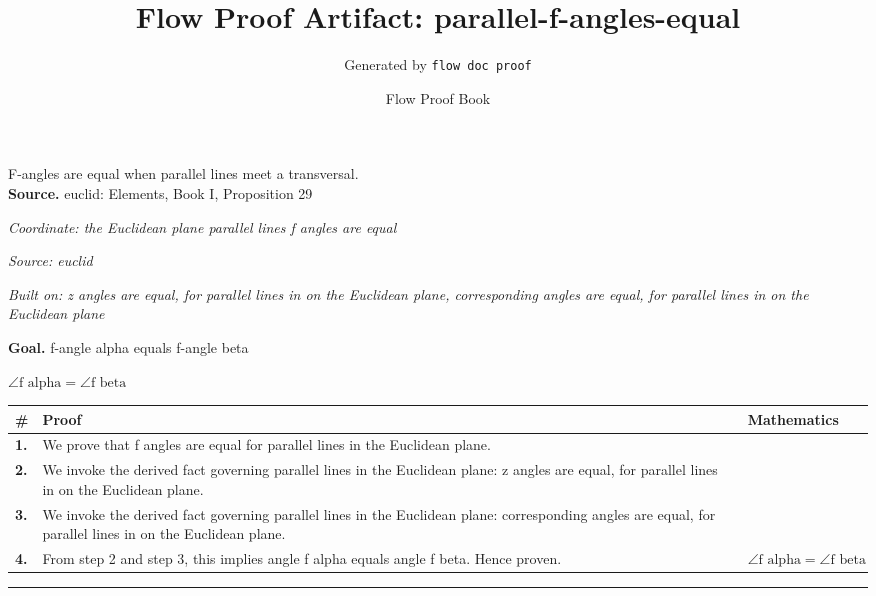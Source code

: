\documentclass[11pt]{article}
\title{Flow Proof Artifact: parallel-f-angles-equal}
\author{Generated by \texttt{flow doc proof}}
\date{Flow Proof Book}
\theoremstyle{definition}
\begin{document}
\maketitle
F-angles are equal when parallel lines meet a transversal.\\[0.5em]
\textbf{Source.} euclid: Elements, Book I, Proposition 29\\[0.5em]
\bigskip
{}\par
\smallskip\noindent\textit{Coordinate: the Euclidean plane \cdot parallel lines \cdot f angles are equal}\par
\smallskip\noindent\textit{Source: euclid}\par
\smallskip\noindent\textit{Built on: z angles are equal, for parallel lines in on the Euclidean plane, corresponding angles are equal, for parallel lines in on the Euclidean plane}\par
\medskip
\noindent\textbf{Goal.} f-angle alpha equals f-angle beta\par
\noindent$\displaystyle \angle \text{f alpha} = \angle \text{f beta}$\par
\medskip
\noindent
\begin{tabular}{@{} >{\raggedright\arraybackslash}p{} >{\raggedright\arraybackslash}p{} >{\raggedleft\arraybackslash}p{} @{}}
\textbf{\#} & \textbf{Proof} & \textbf{Mathematics} \\
\midrule
\textbf{1.} & We prove that f angles are equal for parallel lines in the Euclidean plane. & \\[0.45em]
\textbf{2.} & We invoke the derived fact governing parallel lines in the Euclidean plane: z angles are equal, for parallel lines in on the Euclidean plane. & \\[0.45em]
\textbf{3.} & We invoke the derived fact governing parallel lines in the Euclidean plane: corresponding angles are equal, for parallel lines in on the Euclidean plane. & \\[0.45em]
\textbf{4.} & From step 2 and step 3, this implies angle f alpha equals angle f beta. Hence proven. & $\displaystyle \angle \text{f alpha} = \angle \text{f beta}$ \\[0.45em]
\bottomrule
\end{tabular}
\label{thm:Geometry-parallel lines-f_angles_are_equal}
\par\medskip\hrule
\end{document}
